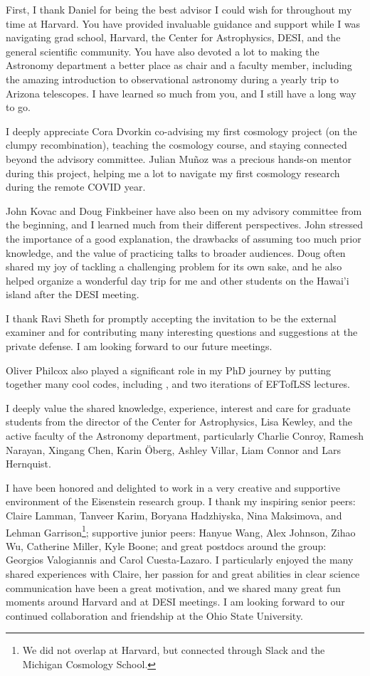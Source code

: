 First, I thank Daniel for being the best advisor I could wish for throughout my time at Harvard.
You have provided invaluable guidance and support while I was navigating grad school, Harvard, the Center for Astrophysics, DESI, and the general scientific community.
You have also devoted a lot to making the Astronomy department a better place as chair and a faculty member, including the amazing introduction to observational astronomy during a yearly trip to Arizona telescopes.
I have learned so much from you, and I still have a long way to go.

I deeply appreciate Cora Dvorkin co-advising my first cosmology project (on the clumpy recombination), teaching the cosmology course, and staying connected beyond the advisory committee.
Julian Mu\~noz was a precious hands-on mentor during this project, helping me a lot to navigate my first cosmology research during the remote COVID year.

John Kovac and Doug Finkbeiner have also been on my advisory committee from the beginning, and I learned much from their different perspectives.
John stressed the importance of a good explanation, the drawbacks of assuming too much prior knowledge, and the value of practicing talks to broader audiences.
Doug often shared my joy of tackling a challenging problem for its own sake, and he also helped organize a wonderful day trip for me and other students on the Hawai'i island after the DESI meeting.

I thank Ravi Sheth for promptly accepting the invitation to be the external examiner and for contributing many interesting questions and suggestions at the private defense.
I am looking forward to our future meetings.

Oliver Philcox also played a significant role in my PhD journey by putting together many cool codes, including \rascalc{}, and two iterations of EFTofLSS lectures.

I deeply value the shared knowledge, experience, interest and care for graduate students from the director of the Center for Astrophysics, Lisa Kewley, and the active faculty of the Astronomy department, particularly Charlie Conroy, Ramesh Narayan, Xingang Chen, Karin \"Oberg, Ashley Villar, Liam Connor and Lars Hernquist.

I have been honored and delighted to work in a very creative and supportive environment of the Eisenstein research group.
I thank my inspiring senior peers: Claire Lamman, Tanveer Karim, Boryana Hadzhiyska, Nina Maksimova, and Lehman Garrison\footnote{We did not overlap at Harvard, but connected through Slack and the Michigan Cosmology School.};
supportive junior peers: Hanyue Wang, Alex Johnson, Zihao Wu, Catherine Miller, Kyle Boone;
and great postdocs around the group: Georgios Valogiannis and Carol Cuesta-Lazaro.
I particularly enjoyed the many shared experiences with Claire, her passion for and great abilities in clear science communication have been a great motivation, and we shared many great fun moments around Harvard and at DESI meetings.
I am looking forward to our continued collaboration and friendship at the Ohio State University.

